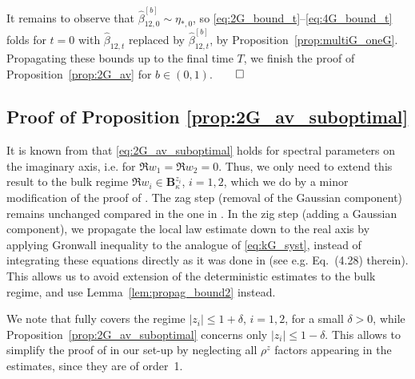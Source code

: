 \documentclass[10pt]{amsart}
\numberwithin{equation}{section}
\begin{document}
It remains to observe that $\widehat{\beta}^{[b]}_{12,0}\sim \eta_{*,0}$, so \eqref{eq:2G_bound_t}--\eqref{eq:4G_bound_t} folds for $t=0$ with $\widehat{\beta}_{12,t}$ replaced by $\widehat{\beta}_{12,t}^{[b]}$, by Proposition~\ref{prop:multiG_oneG}. Propagating these bounds up to the final time $T$, we finish the proof of Proposition~\ref{prop:2G_av} for $b\in (0,1)$.\hfill$\qed$



\subsection{Proof of Proposition \ref{prop:2G_av_suboptimal}}\label{sec:2G_av_subopt} It is known from \cite[Theorem~3.4]{nonHermdecay} that \eqref{eq:2G_av_suboptimal} holds for spectral parameters on the imaginary axis, i.e. for $\Re w_1=\Re w_2=0$. Thus, we only need to extend this result to the bulk regime $\Re w_i\in\mathbf{B}_\kappa^{z_i}$, $i=1,2$, which we do by a minor modification of the proof of \cite[Theorem~3.4]{nonHermdecay}. The zag step (removal of the Gaussian component) remains unchanged compared in the one in \cite[Section~5]{nonHermdecay}. In the zig step (adding a Gaussian component), we propagate the local law estimate down to the real axis by applying Gronwall inequality to the analogue of \eqref{eq:kG_syst}, instead of integrating these equations directly as it was done in \cite{nonHermdecay} (see e.g. Eq.~(4.28) therein). This allows us to avoid extension of the deterministic estimates \cite[Eq.(4.27)]{nonHermdecay} to the bulk regime, and use Lemma~\ref{lem:propag_bound2} instead.


We note that \cite{nonHermdecay} fully covers the regime $|z_i|\le 1+\delta$, $i=1,2$, for a small $\delta>0$, while Proposition~\ref{prop:2G_av_suboptimal} concerns only $|z_i|\le 1-\delta$. This allows to simplify the proof of \cite[Theorem~3.4]{nonHermdecay} in our set-up by neglecting all $\rho^z$ factors appearing in the estimates, since they are of order~1.
\end{document}
